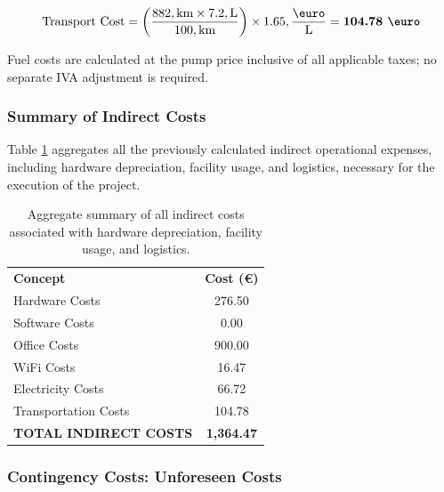 \begin{equation}
\text{Transport Cost} = \left( \frac{882 , \text{km} \times 7.2 , \text{L}}{100 , \text{km}} \right) \times 1.65 , \frac{\text{\euro}}{\text{L}} = \textbf{104.78 \euro}
\end{equation}

Fuel costs are calculated at the pump price inclusive of all applicable
taxes; no separate IVA adjustment is required.



\subsubsection*{Summary of Indirect Costs}

Table \ref{tab:indirect-costs-summary} aggregates all the previously calculated indirect operational expenses, including hardware depreciation, facility usage, and logistics, necessary for the execution of the project.

\begin{table}[H]
\centering
\caption{Aggregate summary of all indirect costs associated with hardware depreciation, facility usage, and logistics.}
\label{tab:indirect-costs-summary}
\begin{tabular}{lc}
\rowcolor[HTML]{34495E} 
{\color[HTML]{FFFFFF} \textbf{Concept}} & {\color[HTML]{FFFFFF} \textbf{Cost (€)}} \\ 
\rowcolor[HTML]{D5D8DC} 
Hardware Costs & 276.50 \\ 
Software Costs & 0.00 \\ 
\rowcolor[HTML]{D5D8DC} 
Office Costs & 900.00 \\ 
WiFi Costs & 16.47 \\ 
\rowcolor[HTML]{D5D8DC} 
Electricity Costs & 66.72 \\ 
Transportation Costs & 104.78 \\ \hline
\rowcolor[HTML]{2C3E50} 
{\color[HTML]{FFFFFF} \textbf{TOTAL INDIRECT COSTS}} & {\color[HTML]{FFFFFF} \textbf{1,364.47}} \\ \hline
\end{tabular}%
\end{table}

\subsubsection{Contingency Costs: Unforeseen Costs}
\label{subsubsec:contingency-costs-unforeseen-costs}

